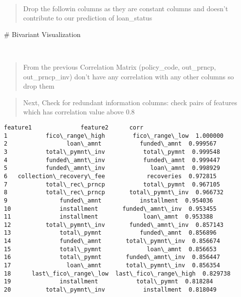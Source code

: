\documentclass[11pt]{article}
\makeatletter
\newcommand{\boxspacing}{\kern\kvtcb@left@rule\kern\kvtcb@boxsep}
\newcommand{\prompt}[4]{
        {\ttfamily\llap{{\color{#2}[#3]:\hspace{3pt}#4}}\vspace{-\baselineskip}}
    }
\makeatother
\begin{document}
    \begin{center}
    \end{center}
    { \hspace*{\fill} \\}
    
    \begin{quote}
Drop the followin columns as they are constant columns and doesn't
contribute to our prediction of loan\_status
\end{quote}

    \# Bivariant Visualization

    \begin{center}
    \end{center}
    { \hspace*{\fill} \\}
    
    \begin{quote}
From the previous Correlation Matrix (policy\_code, out\_prncp,
out\_prncp\_inv) don't have any correlation with any other columns so
drop them
\end{quote}

    \begin{quote}
Next, Check for redundant information columns: check pairs of features
which has correlation value above 0.8
\end{quote}

            \begin{tcolorbox}[breakable, size=fbox, boxrule=.5pt, pad at break*=1mm, opacityfill=0]
\prompt{Out}{outcolor}{42}{\boxspacing}
\begin{Verbatim}[commandchars=\\\{\}]
                   feature1              feature2      corr
1           fico\_range\_high        fico\_range\_low  1.000000
2                 loan\_amnt           funded\_amnt  0.999567
3           total\_pymnt\_inv           total\_pymnt  0.999548
4           funded\_amnt\_inv           funded\_amnt  0.999447
5           funded\_amnt\_inv             loan\_amnt  0.998929
6   collection\_recovery\_fee            recoveries  0.972815
7           total\_rec\_prncp           total\_pymnt  0.967105
8           total\_rec\_prncp       total\_pymnt\_inv  0.966732
9               funded\_amnt           installment  0.954036
10              installment       funded\_amnt\_inv  0.953455
11              installment             loan\_amnt  0.953388
12          total\_pymnt\_inv       funded\_amnt\_inv  0.857143
13              total\_pymnt           funded\_amnt  0.856896
14              funded\_amnt       total\_pymnt\_inv  0.856674
15              total\_pymnt             loan\_amnt  0.856653
16              total\_pymnt       funded\_amnt\_inv  0.856447
17                loan\_amnt       total\_pymnt\_inv  0.856354
18      last\_fico\_range\_low  last\_fico\_range\_high  0.829738
19              installment           total\_pymnt  0.818284
20          total\_pymnt\_inv           installment  0.818049
\end{Verbatim}
\end{tcolorbox}
        
\end{document}
